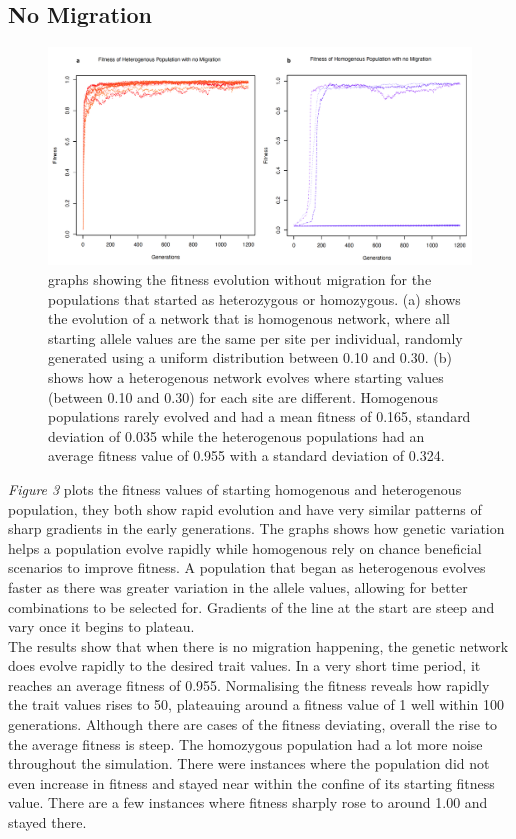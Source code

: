 \subsection{No Migration}
\begin{figure}[h]
    \centering
        \includegraphics[scale=0.3]{../Results/early_no_migration.jpg}
    \caption{graphs showing the fitness evolution without migration for the populations that started as heterozygous or homozygous. (a) shows the evolution of a network that is homogenous network, where all starting allele values are the same per site per individual, randomly generated using a uniform distribution between 0.10 and 0.30. (b) shows how a heterogenous network evolves where starting values (between 0.10 and 0.30) for each site are different. Homogenous populations rarely evolved and had a mean fitness of 0.165, standard deviation of 0.035 while the heterogenous populations had an average fitness value of 0.955 with a standard deviation of 0.324.}
    \label{fig:No Migration}
\end{figure}
\textit{Figure 3} plots the fitness values of starting homogenous and heterogenous population, they both show rapid evolution and have very similar patterns of sharp gradients in the early generations. The graphs shows how genetic variation helps a population evolve rapidly while homogenous rely on chance beneficial scenarios to improve fitness. A population that began as heterogenous evolves faster as there was greater variation in the allele values, allowing for better combinations to be selected for. Gradients of the line at the start are steep and vary once it begins to plateau.\\
The results show that when there is no migration happening, the genetic network does evolve rapidly to the desired trait values. In a very short time period, it reaches an average fitness of 0.955. Normalising the fitness reveals how rapidly the trait values rises to 50, plateauing around a fitness value of 1 well within 100 generations. Although there are cases of the fitness deviating, overall the rise to the average fitness is steep. The homozygous population had a lot more noise throughout the simulation. There were instances where the population did not even increase in fitness and stayed near within the confine of its starting fitness value. There are a few instances where fitness sharply rose to around 1.00 and stayed there.
